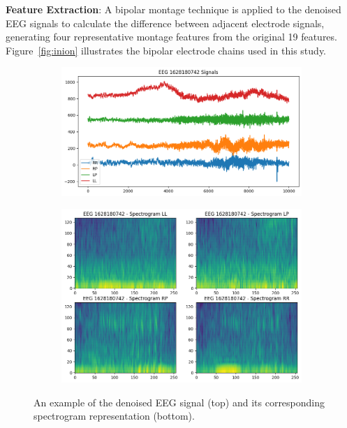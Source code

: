 \documentclass[conference]{IEEEtran}
\begin{document}
\textbf{Feature Extraction}: A bipolar montage technique is applied to the
denoised EEG signals to calculate the difference between adjacent electrode
signals, generating four representative montage features from the original 19
features. Figure~\ref{fig:inion} illustrates the bipolar electrode chains used
in this study.


\begin{figure}[tp]
\centering
\begin{subfigure}[b]{0.45\textwidth}
\includegraphics[width=\textwidth]{EEG_Signal}
\end{subfigure}
\hfill
\begin{subfigure}[b]{0.45\textwidth}
\includegraphics[width=\textwidth]{EEG_Spectrogram}
\end{subfigure}
\caption{An example of the denoised EEG signal (top) and its corresponding
spectrogram representation (bottom).}
\label{fig:EEG}
\end{figure}
\end{document}
